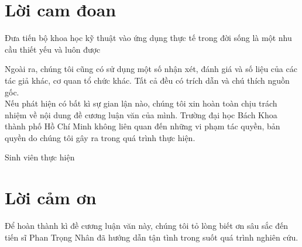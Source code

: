 \documentclass[12pt,a4paper,oneside]{book} %
\begin{document}

\coverpage

\frontmatter

\chapter*{Lời cam đoan}
\noindent 
Đưa tiến bộ khoa học kỹ thuật vào ứng dụng thực tế trong đời sống là một nhu cầu thiết yếu và luôn được 


Ngoài ra, chúng tôi cũng có sử dụng một số nhận xét, đánh giá và số liệu của các tác giả khác, cơ quan tổ chức khác. Tất cả đều có trích dẫn và chú thích nguồn gốc. \\

Nếu phát hiện có bất kì sự gian lận nào, chúng tôi xin hoàn toàn chịu trách nhiệm về nội dung đề cương luận văn của mình. Trường đại học Bách Khoa thành phố Hồ Chí Minh không liên quan đến những vi phạm tác quyền, bản quyền do chúng tôi gây ra trong quá trình thực hiện.
\begin{flushright}
Sinh viên thực hiện
\end{flushright}
\chapter*{Lời cảm ơn}
\noindent 	Để hoàn thành kì đề cương luận văn này, chúng tôi tỏ lòng biết ơn sâu sắc đến tiến sĩ Phan Trọng Nhân đã hướng dẫn tận tình trong suốt quá trình nghiên cứu. \\
	
\end{document}
